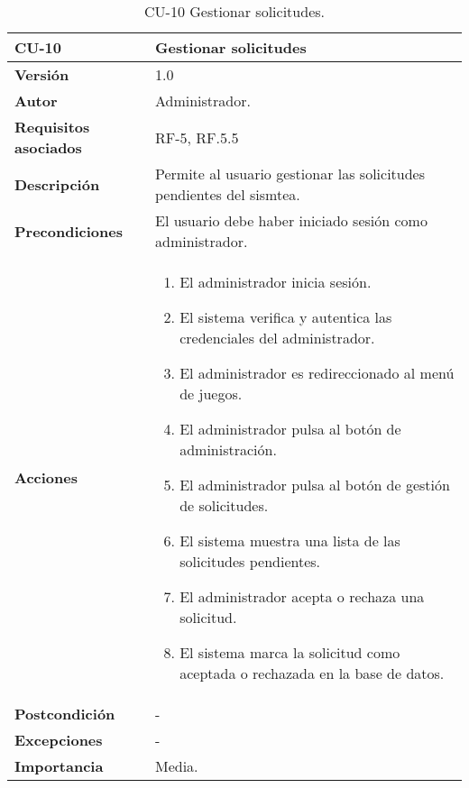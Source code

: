 \begin{table}[h!]
	\centering
	\begin{tabularx}{\linewidth}{ p{} p{} }
		\toprule
		\textbf{CU-10}    & \textbf{Gestionar solicitudes}\\
		\toprule
		\textbf{Versión}              & 1.0    \\
		\textbf{Autor}                & Administrador. \\
		\textbf{Requisitos asociados} & RF-5, RF.5.5 \\
		\textbf{Descripción}          & Permite al usuario gestionar las solicitudes pendientes del sismtea.\\
		\textbf{Precondiciones}         & El usuario debe haber iniciado sesión como administrador. \\
		\textbf{Acciones}             &
		\begin{enumerate}
			\def\labelenumi{\arabic{enumi}.}
			\tightlist
			\item El administrador inicia sesión.
            \item El sistema verifica y autentica las credenciales del administrador.
            \item El administrador es redireccionado al menú de juegos.
            \item El administrador pulsa al botón de administración.
            \item El administrador pulsa al botón de gestión de solicitudes.
            \item El sistema muestra una lista de las solicitudes pendientes.
    	\item El administrador acepta o rechaza una solicitud.
    	\item El sistema marca la solicitud como aceptada o rechazada en la base de datos.
		\end{enumerate}\\
         \textbf{Postcondición}             & - \\
		\textbf{Excepciones}             & - \\
		\textbf{Importancia}          & Media. \\
		\bottomrule
	\end{tabularx}
	\caption{CU-10 Gestionar solicitudes.}
\end{table}

